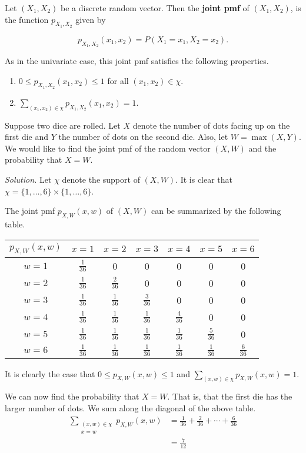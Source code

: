 \begin{definition}
	Let $(X_1,X_2)$ be a discrete random vector. Then the \textbf{joint pmf} of $(X_1,X_2)$, is the function $p_{X_1,X_2}$ given by

	$$p_{X_1,X_2}(x_1,x_2)=P(X_1=x_1,X_2=x_2).$$
\end{definition}

As in the univariate case, this joint pmf satisfies the following properties.
\begin{enumerate}
	\item $0\leq p_{X_1,X_2}(x_1,x_2)\leq 1$ for all $(x_1,x_2)\in\chi$.
	\item $\sum_{(x_1,x_2)\in\chi}p_{X_1,X_2}(x_1,x_2)=1$.
\end{enumerate}

\begin{example}[]\label{ex:dice_jointpmf}
	Suppose two dice are rolled. Let $X$ denote the number of dots facing up on the first die and $Y$ the number of dots on the second die. Also, let $W=\max(X,Y)$. We would like to find the joint pmf of the random vector $(X,W)$ and the probability that $X=W$.

	\textit{Solution.} Let $\chi$ denote the support of $(X,W)$. It is clear that $\chi=\{1,\hdots,6\}\times\{1,\hdots,6\}$.

	The joint pmf $p_{X,W}(x,w)$ of $(X,W)$ can be summarized by the following table.

	\begin{center}
	\begin{tabular}{c | c c c c c c}
		$p_{X,W}(x,w)$ & $x=1$ & $x=2$ & $x=3$ & $x=4$ & $x=5$ & $x=6$\\\hline
		$w=1$ & $\frac{1}{36}$ & 0 & 0 & 0 & 0 & 0\\
		$w=2$ & $\frac{1}{36}$ & $\frac{2}{36}$ & 0 & 0 & 0 & 0\\
		$w=3$ & $\frac{1}{36}$ & $\frac{1}{36}$ & $\frac{3}{36}$ & 0 & 0 & 0\\
		$w=4$ & $\frac{1}{36}$ & $\frac{1}{36}$ & $\frac{1}{36}$ & $\frac{4}{36}$ & 0 & 0\\
		$w=5$ & $\frac{1}{36}$ & $\frac{1}{36}$ & $\frac{1}{36}$ & $\frac{1}{36}$ & $\frac{5}{36}$ & 0\\
		$w=6$ & $\frac{1}{36}$ & $\frac{1}{36}$ & $\frac{1}{36}$ & $\frac{1}{36}$ & $\frac{1}{36}$ & $\frac{6}{36}$
	\end{tabular}
	\end{center}

	It is clearly the case that $0\leq p_{X,W}(x,w)\leq 1$ and $\sum_{(x,w)\in\chi}p_{X,W}(x,w)=1$.

	We can now find the probability that $X=W$. That is, that the first die has the larger number of dots. We sum along the diagonal of the above table.
	\begin{align*}
		\sum_{\substack{(x,w)\in\chi\\x=w}}p_{X,W}(x,w)&=\frac 1{36}+\frac{2}{36}+\cdots+\frac{6}{36}\\
		&=\frac{7}{12}
	\end{align*}

\end{example}

